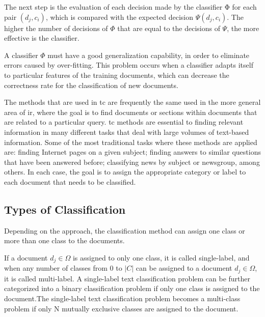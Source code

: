 The next step is the evaluation of each decision made by the classifier
Φ for each pair $(d_j, c_i)$, which is compared with the expected decision $\Psi(d_j, c_i)$. The higher the number of decisions of $\Phi$ that are equal to the decisions of $\Psi$, the more effective is the classifier.

A classifier $\Phi$ must have a good generalization capability, in order to eliminate errors caused by over-fitting. This problem occurs when a classifier adapts itself to particular features of the training documents, which can decrease the correctness rate for the classification of new
documents.

The methods that are used in \gls{tc} are frequently the same used in the more general area of \gls{ir}, where the goal is to find documents or sections within documents that are related to a particular query. \gls{tc} methods are essential to finding relevant information in many different tasks that deal with large volumes of text-based information. Some of the most traditional tasks where these methods are applied are: finding Internet pages on a given subject; finding answers to similar questions that have been answered before; classifying news by subject or newsgroup, among others. In each case, the goal is to assign the appropriate category or label to each document that needs to be classified.





\subsection{\hspace*{3pt}Types of Classification}

Depending on the approach, the classification method can assign one class or more than one class to the documents. 

If a document  $ d_j \in \Omega $  is assigned to only one class, it is called single-label, and when any number of classes from 0 to $|C|$ can be assigned to a document $d_j \in \Omega$, it is called multi-label. A single-label text classification problem can be further categorized into a  binary classification problem if only one class is assigned to the document.The single-label text classification problem becomes a multi-class problem if only N mutually exclusive classes are assigned to the document. 

